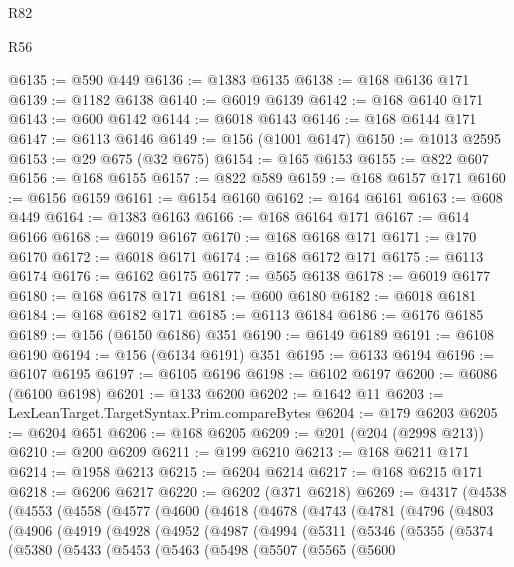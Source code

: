 \begin{lexlean}{R82}
\begin{lexlean}{R56}
\begin{coremodule}
{{{{{{{{{{{{{{{{{{{{{{{{{{{{{{{{{{{{{{{{{{{{{{{{{{{{{{{{{{{{{{{{{{{{{{{{{{{{{{{{{{{{{{{{{{{{{{{{{{{{{{{{{{{{{{{{{{{{{{{{{{{{{{{{{{{{{{{{{{{{{{{{{{{{{{{{{{{{{{{{{{{{{{{{{{{{{{{{{{{{{{{{{{{{{{{{{{{{{{{{{{{{{{{{{{{@6135 := @590 @449
@6136 := @1383 @6135
@6138 := @168 @6136 @171
@6139 := @1182 @6138
@6140 := @6019 @6139
@6142 := @168 @6140 @171
@6143 := @600 @6142
@6144 := @6018 @6143
@6146 := @168 @6144 @171
@6147 := @6113 @6146
@6149 := @156 (@1001 @6147)
@6150 := @1013 @2595
@6153 := @29 @675 (@32 @675)
@6154 := @165 @6153
@6155 := @822 @607
@6156 := @168 @6155
@6157 := @822 @589
@6159 := @168 @6157 @171
@6160 := @6156 @6159
@6161 := @6154 @6160
@6162 := @164 @6161
@6163 := @608 @449
@6164 := @1383 @6163
@6166 := @168 @6164 @171
@6167 := @614 @6166
@6168 := @6019 @6167
@6170 := @168 @6168 @171
@6171 := @170 @6170
@6172 := @6018 @6171
@6174 := @168 @6172 @171
@6175 := @6113 @6174
@6176 := @6162 @6175
@6177 := @565 @6138
@6178 := @6019 @6177
@6180 := @168 @6178 @171
@6181 := @600 @6180
@6182 := @6018 @6181
@6184 := @168 @6182 @171
@6185 := @6113 @6184
@6186 := @6176 @6185
@6189 := @156 (@6150 @6186) @351
@6190 := @6149 @6189
@6191 := @6108 @6190
@6194 := @156 (@6134 @6191) @351
@6195 := @6133 @6194
@6196 := @6107 @6195
@6197 := @6105 @6196
@6198 := @6102 @6197
@6200 := @6086 (@6100 @6198)
@6201 := @133 @6200
@6202 := @1642 @11
@6203 := LexLeanTarget.TargetSyntax.Prim.compareBytes
@6204 := @179 @6203
@6205 := @6204 @651
@6206 := @168 @6205
@6209 := @201 (@204 (@2998 @213))
@6210 := @200 @6209
@6211 := @199 @6210
@6213 := @168 @6211 @171
@6214 := @1958 @6213
@6215 := @6204 @6214
@6217 := @168 @6215 @171
@6218 := @6206 @6217
@6220 := @6202 (@371 @6218)
@6269 := @4317
    (@4538
      (@4553
        (@4558
          (@4577
            (@4600
              (@4618
                (@4678
                  (@4743
                    (@4781
                      (@4796
                        (@4803
                          (@4906
                            (@4919
                              (@4928
                                (@4952
                                  (@4987
                                    (@4994
                                      (@5311
                                        (@5346
                                          (@5355
                                            (@5374
                                              (@5380
                                                (@5433
                                                  (@5453
                                                    (@5463
                                                      (@5498
                                                        (@5507
                                                          (@5565
                                                            (@5600
}}}}}}}}}}}}}}}}}}}}}}}}}}}}}}}}}}}}}}}}}}}}}}}}}}}}}}}}}}}}}}}}}}}}}}}}}}}}}}}}}}}}}}}}}}}}}}}}}}}}}}}}}}}}}}}}}}}}}}}}}}}}}}}}}}}}}}}}}}}}}}}}}}}}}}}}}}}}}}}}}}}}}}}}}}}}}}}}}}}}}}}}}}}}}}}}}}}}}}}}}}}}}}}}}}}
\end{coremodule}
\end{lexlean}
\end{lexlean}

